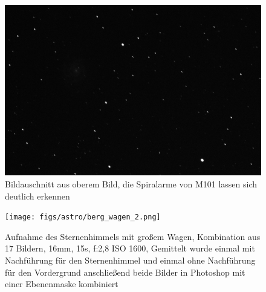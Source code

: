 \begin{figure}
\centering
\includegraphics[width=\textwidth]{figs/astro/m101_crop.jpg}
\caption{Bildauschnitt aus oberem Bild, die Spiralarme von M101 lassen sich deutlich erkennen}
\end{figure}


\begin{figure}
\centering
\texttt{[image: figs/astro/berg\_wagen\_2.png]}
\caption{Aufnahme des Sternenhimmels mit großem Wagen, Kombination aus 17 Bildern, 16mm, 15s, f:2,8 ISO 1600, Gemittelt wurde einmal mit Nachführung für den Sternenhimmel und einmal ohne Nachführung für den Vordergrund  anschließend beide Bilder in Photoshop mit einer Ebenenmaske kombiniert}
\end{figure}